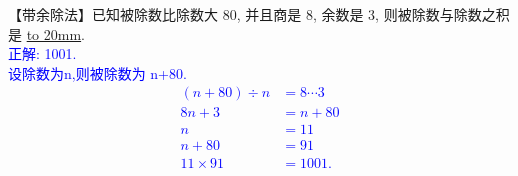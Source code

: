 \item {
    【带余除法】已知被除数比除数大 80, 并且商是 8, 余数是 3, 则被除数与除数之积是 \underline{\hbox to 20mm{}}.
    \ifshowSolution
        \\\fangsong{}\textcolor{blue}{
            正解: 1001.\\
            设除数为n,则被除数为 n+80.\\
            \begin{align*}
                (n+80)\div n &= 8\cdots 3\\
                8n + 3 &= n + 80\\
                n&=11\\
                n+80&=91\\
                11\times 91 &= 1001.
            \end{align*}
        }
    \else
        \vspace{1cm}
    \fi
}

